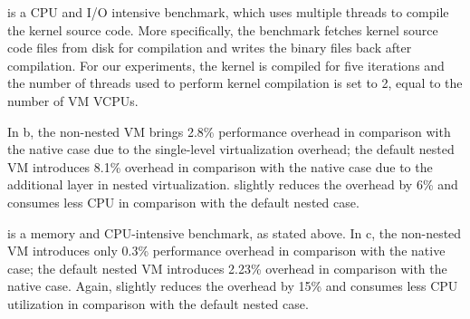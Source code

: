 


 \cite{kernbench} is a CPU and I/O intensive benchmark, which uses multiple threads to compile the kernel source code. More specifically, the benchmark fetches kernel source code files from disk for compilation and writes the binary files back after compilation. For our experiments, the kernel is compiled for five iterations and the number of threads used to perform kernel compilation is set to 2, equal to the number of VM VCPUs. 

In b, the non-nested VM brings 2.8\% performance overhead in comparison with the native case due to the single-level virtualization overhead; the default nested VM introduces 8.1\% overhead in comparison with the native case due to the additional layer in nested virtualization. %
\arch slightly reduces the overhead by 6\% and consumes less CPU in comparison with the default nested case.

 is a memory and CPU-intensive benchmark, as stated above. In c, the non-nested VM introduces only 0.3\% performance overhead in comparison with the native case; the default nested VM introduces 2.23\% overhead in comparison with the native case. %
Again, \arch slightly reduces the overhead by 15\% and consumes less CPU utilization in comparison with the default nested case.

